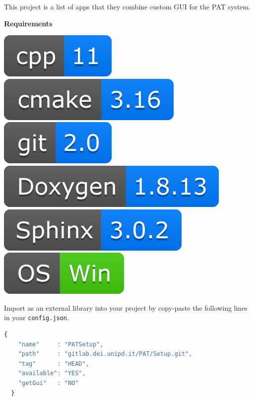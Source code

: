 
This project is a list of apps that they combine custom GUI for the PAT
system.

\textbf{Requirements}

\includegraphics[scale=0.7]{img/shilds/cpp.png}
\includegraphics[scale=0.7]{img/shilds/cmake.png}
\includegraphics[scale=0.7]{img/shilds/git.png}
\includegraphics[scale=0.7]{img/shilds/doxygen.png}
\includegraphics[scale=0.7]{img/shilds/sphinx.png}
\includegraphics[scale=0.7]{img/shilds/win.png}



Import as an external library into your project by copy-paste the
following lines in your \texttt{config.json}.

\begin{lstlisting}[language=javascript, gobble=2]
  {
    "name"     : "PATSetup",
    "path"     : "gitlab.dei.unipd.it/PAT/Setup.git",
    "tag"      : "HEAD",
    "available": "YES",
    "getGui"   : "NO"
  }
\end{lstlisting}

